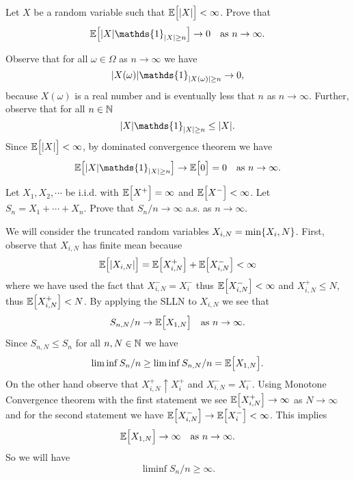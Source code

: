 \begin{problem}
	Let $ X $ be a random variable such that $ \mathbb{E}\big[|X|\big]<\infty $. Prove that
	\[ \E{\abs{X}\mathds{1}_{\abs{X}\geq n}}\to0 \quad \text{as $ n\to\infty $}. \]
\end{problem}
\begin{solution}
	Observe that for all $ \omega \in \Omega $ as $ n\to\infty $ we have
	\[ \abs{X(\omega)}\mathds{1}_{\abs{X(\omega)}\geq n} \to 0, \]
	because $ X(\omega) $ is a real number and is eventually less that $ n $ as $ n\to\infty $. Further, observe that for all $ n\in \mathbb{N} $
	\[ \abs{X}\mathds{1}_{\abs{X}\geq n} \leq \abs{X}. \]
	Since $ \mathbb{E}\big[|X|\big]<\infty $, by dominated convergence theorem we have
	\[ \E{\abs{X}\mathds{1}_{\abs{X}\geq n}}\to \E{0} = 0 \quad \text{as $ n\to\infty $}. \]
\end{solution}

\begin{problem}
	Let $ X_1,X_2,\cdots $ be i.i.d.  with $ \mathbb{E}\big[X^+\big]=\infty $ and $ \mathbb{E}\big[X^-\big]<\infty $. Let $ S_n = X_1 + \cdots + X_n $. Prove that $ S_n/n \to\infty $ a.s. as $ n\to\infty $.
\end{problem}
\begin{solution}
	We will consider the truncated random variables $ X_{i,N} = \min\{X_i, N\} $. First, observe that $ X_{i,N} $ has finite mean because
	\[ \mathbb{E}\big[|X_{i,N}|\big] = \mathbb{E}\big[X_{i,N}^+\big] + \mathbb{E}\big[X_{i,N}^-\big] <\infty \]
	where we have used the fact that $ X_{i,N}^- = X_i^- $ thus $ \mathbb{E}\big[X_{i,N}^-\big]<\infty $ and $ X_{i,N}^+ \leq N $, thus $ \mathbb{E}\big[X_{i,N}^+\big]<N $. By applying the SLLN to $ X_{i,N} $ we see that 
	\[ S_{n,N}/n \to \mathbb{E}\big[X_{1,N}\big] \quad \text{as $ n\to\infty $}. \]
	Since $ S_{n,N}\leq S_{n} $ for all $ n,N\in \mathbb{N} $ we have
	\[ \liminf S_{n}/n \geq \liminf S_{n,N}/n = \mathbb{E}\big[X_{1,N}\big]. \]
	On the other hand observe that $ X_{i,N}^+ \uparrow X_i^+ $ and $ X_{i,N}^- = X_i^- $. Using Monotone Convergence theorem with the first statement we see $ \mathbb{E}\big[X_{i,N}^+\big] \to \infty $ as $ N\to \infty $ and for the second statement we have $ \mathbb{E}\big[X_{i,N}^-\big]\to \mathbb{E}\big[X_i^-\big] < \infty $. This implies
	\[ \mathbb{E}\big[X_{1,N}\big]\to \infty\quad \text{as $ n\to\infty $}. \]
	So we will have 
	\[ \liminf S_n/n \geq \infty. \]
\end{solution}

